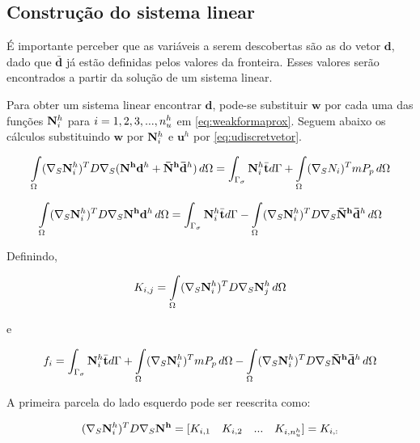 \subsection{Construção do sistema linear}

É importante perceber que as variáveis a serem descobertas são as do vetor $\mathbf{d}$, dado que $\mathbf{\bar{d}}$ já estão definidas pelos valores da fronteira. Esses valores serão encontrados a partir da solução de um sistema linear.

Para obter um sistema linear encontrar $\mathbf{d}$, pode-se substituir $\mathbf{w}$ por cada uma das funções $\basefunctionfine$ para $i = 1, 2, 3, ..., \freedomfine$ em \eqref{eq:weakformaprox}. Seguem abaixo os cálculos substituindo $\mathbf{w}$ por $\basefunctionfine$ e $\mathbf{u}^h$ por \eqref{eq:udiscretvetor}.


\begin{equation}
\omeint{ (\sopnabla \basefunctionfine)^T D \sopnabla (\mathbf{N^h} \mathbf{d}^h + \mathbf{\bar{N}^h} \mathbf{\bar{d}}^h )} = \int_{\Gamma_\sigma} \basefunctionfine \bar{\mathbf{t}}  d\Gamma + \omeint{(\sopnabla N_i)^T m P_p}
\end{equation}

\begin{equation}\label{eq:umaequacaosistema}
\omeint{ (\sopnabla \basefunctionfine)^T D \sopnabla \mathbf{N^h} \mathbf{d}^h }  = \int_{\Gamma_\sigma} \basefunctionfine \bar{\mathbf{t}}  d\Gamma - \omeint{ (\sopnabla \basefunctionfine)^T D \sopnabla  \mathbf{\bar{N}^h} \mathbf{\bar{d}}^h} 
\end{equation}

Definindo, 

\begin{equation}\label{eq:entradamatriz}
    K_{i,j} = \omeint{(\sopnabla \basefunctionfine)^T D \sopnabla \basefunctionfine[j]}
\end{equation}

e

\begin{equation}\label{eq:entradald}
    f_i = \int_{\Gamma_\sigma} \basefunctionfine \bar{\mathbf{t}}  d\Gamma + \omeint{(\sopnabla \basefunctionfine)^T m P_p} - \omeint{ (\sopnabla \basefunctionfine)^T D \sopnabla  \mathbf{\bar{N}^h} \mathbf{\bar{d}}^h} 
\end{equation}



A primeira parcela do lado esquerdo pode ser reescrita como:

\begin{equation}
     (\sopnabla \basefunctionfine)^T D \sopnabla \mathbf{N^h} = [K_{i,1}\quad  K_{i,2} \quad ... \quad K_{i,\freedomfine}] = K_{i,:} 
\end{equation}

